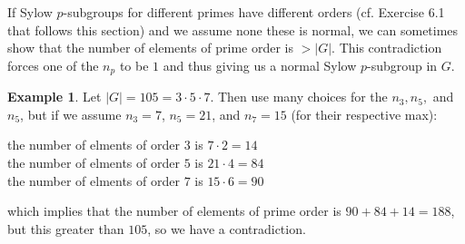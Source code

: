 \documentclass[9pt,reqno]{amsart}
\theoremstyle{definition}
\newtheorem{ex}{Example}[section]
\begin{document}
If Sylow $p$-subgroups for different primes have different orders (cf. Exercise 6.1 that follows this section) and we assume none these is normal, we can sometimes show that the number of elements of prime order is $> |G|$. This contradiction forces one of the $n_p$ to be $1$ and thus giving us a normal Sylow $p$-subgroup in $G$. 
\begin{ex}
Let $|G| = 105 = 3 \cdot 5 \cdot 7$. Then use many choices for the $n_3, n_5,$ and $n_5$, but if we assume $n_3 = 7$, $n_5 = 21$, and $n_7 =15$ (for their respective max): 
\begin{center}
the number of elments of order $3$ is $7 \cdot 2 = 14$ \\
the number of elments of order $5$ is $21 \cdot 4 = 84$ \\
the number of elments of order $7$ is $15 \cdot 6 = 90$ 
\end{center}
	which implies that the number of elements of prime order is $90 + 84 + 14 = 188$, but this greater than $ 105$, so we have a contradiction. 
	\end{ex}
\end{document}
